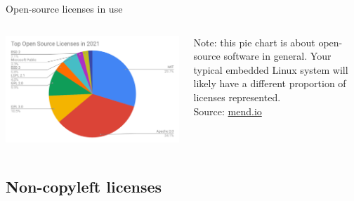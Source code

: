 \begin{frame}{Open-source licenses in use}
  \begin{columns}
    \begin{center}
      \includegraphics[width=\textwidth]{slides/sysdev-licensing/open-source-licenses-share.png}
    \end{center}
    Note: this pie chart is about open-source software in
    general. Your typical embedded Linux system will likely have a
    different proportion of licenses represented.\\
    \vspace{0.5cm}
    Source: \href{https://www.mend.io/resources/blog/open-source-licenses-trends-and-predictions/}{mend.io}
  \end{columns}
\end{frame}

\subsection{Non-copyleft licenses}


